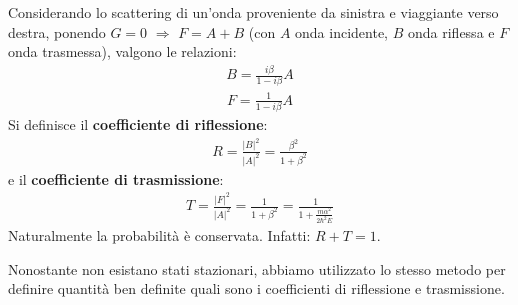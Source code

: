 Considerando lo scattering di un'onda proveniente da sinistra e viaggiante verso destra, ponendo $G=0$ $\Longrightarrow $ $F=A+B$ (con $A$ onda incidente, $B$ onda riflessa e $F$ onda trasmessa), valgono le relazioni:
\begin{equation}\begin{split}
B=\frac{i\beta}{1-i\beta}A
\end{split}\end{equation}
\begin{equation}\begin{split}
F=\frac{1}{1-i\beta}A
\end{split}\end{equation}
Si definisce il \textbf{coefficiente di riflessione}:
\begin{equation}\begin{split}
R=\frac{|B|^2}{|A|^2}=\frac{\beta^2}{1+\beta^2}
\end{split}\end{equation}
e il \textbf{coefficiente di trasmissione}:
\begin{equation}\begin{split}
T=\frac{|F|^2}{|A|^2}=\frac{1}{1+\beta^2}=\frac{1}{1+\frac{m\alpha^2}{2\hbar ^2E}}
\end{split}\end{equation}
Naturalmente la probabilità è conservata. Infatti: $R+T=1$.

Nonostante non esistano stati stazionari, abbiamo utilizzato lo stesso metodo per definire quantità ben definite quali sono i coefficienti di riflessione e trasmissione.


